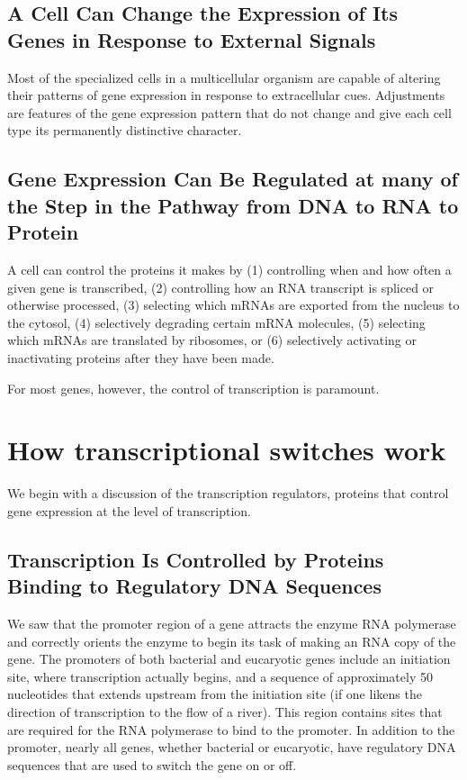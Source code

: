 \subsection{A Cell Can Change the Expression of Its Genes in Response to External Signals}

Most of the specialized cells in a multicellular organism are capable of
altering their patterns of gene expression in response to extracellular
cues. Adjustments are features of the gene expression pattern
that do not change and give each cell type its permanently distinctive
character.

\subsection{Gene Expression Can Be Regulated at many of the Step in the Pathway from DNA to RNA to Protein}

A cell can control the proteins it makes
by (1) controlling when and how often a given gene is transcribed, (2)
controlling how an RNA transcript is spliced or otherwise processed, (3)
selecting which mRNAs are exported from the nucleus to the cytosol,
(4) selectively degrading certain mRNA molecules, (5) selecting which
mRNAs are translated by ribosomes, or (6) selectively activating or inactivating 
proteins after they have been made.

For most genes, however, the control of transcription is paramount.

\section{How transcriptional switches work}

We begin with a discussion of the transcription regulators,
proteins that control gene expression at the level of transcription.

\subsection{Transcription Is Controlled by Proteins Binding to Regulatory DNA Sequences}

We saw that the promoter region of a gene
attracts the enzyme RNA polymerase and correctly orients the enzyme to
begin its task of making an RNA copy of the gene. The promoters of both
bacterial and eucaryotic genes include an initiation site, where transcription 
actually begins, and a sequence of approximately 50 nucleotides that
extends upstream from the initiation site (if one likens the direction of
transcription to the flow of a river). This region contains sites that are
required for the RNA polymerase to bind to the promoter. In addition
to the promoter, nearly all genes, whether bacterial or eucaryotic, have
regulatory DNA sequences that are used to switch the gene on or off.

